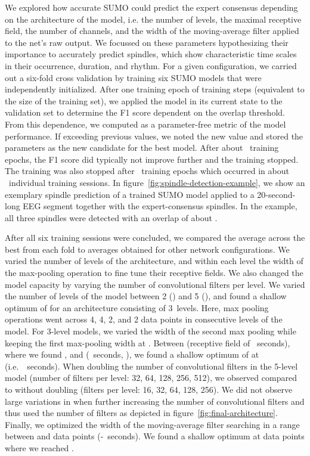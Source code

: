 \documentclass[fleqn,twocolumn,10pt]{wlscirep}
\newcommand{\Fmean}{}
\begin{document}
We explored how accurate SUMO could predict the expert
consensus depending on the architecture of the model, i.e. the number of
levels, the maximal receptive field, the number of channels,
and the width of the moving-average filter applied to the net's raw output.
We focussed on these parameters hypothesizing their importance to accurately
predict spindles, which show characteristic time scales in their occurrence,
duration, and rhythm.
For a given configuration, we carried out a six-fold cross validation by
training six SUMO models that were independently initialized. 
After one training epoch of  training steps 
(equivalent to the size of the training set), we applied the model in its
current state to the validation set to determine the F1 score dependent on the
overlap threshold.  From this dependence, we computed \Fmean{} as a
parameter-free metric of the model performance.  If exceeding previous \Fmean{}
values, we noted the new value and stored the parameters as the new candidate
for the best model.  After about ~training epochs, the F1 score did typically not
improve further and the training stopped.  The training was also stopped after
~training epochs which occurred in about ~individual training sessions.
In figure~\ref{fig:spindle-detection-example}, we show an exemplary spindle
prediction of a trained SUMO model applied to a 20-second-long EEG segment together
with the expert-consensus spindles.  In the example, all three spindles were
detected with an overlap of about .

After all six training sessions were concluded, we compared the average across
the best \Fmean{} from each fold to \Fmean{} averages obtained for other network
configurations.
We varied the number of levels of the architecture, and within each level
the width of the max-pooling operation to fine tune their receptive fields. We
also changed the model capacity by varying the number of convolutional filters
per level.
We varied the number of levels of the model between 2 (\Fmean{})
and 5 (\Fmean{}), and found a shallow optimum of
\Fmean{} for an architecture consisting of 3~levels.  Here, max
pooling operations went across 4, 4, 2, and 2 data points in consecutive levels
of the model.
For 3-level models, we varied the width  of the second max pooling while
keeping the first max-pooling width  at .  Between  (receptive
field of ~seconds), where we found \Fmean{}, and 
(~seconds, \Fmean{}), we found a shallow optimum of
\Fmean{} at  (i.e.~~seconds).
When doubling the number of convolutional filters in the 5-level model (number
of filters per level: 32, 64, 128, 256, 512), we observed
\Fmean{} compared to \Fmean{} without doubling
(filters per level: 16, 32, 64, 128, 256). We did not observe large variations
in \Fmean{} when further increasing the number of convolutional filters and thus
used the number of filters as depicted in figure~\ref{fig:final-architecture}.
Finally, we optimized the width of the moving-average filter searching in a range
between  and  data points (-~seconds).  We found a shallow
optimum at  data points where we reached \Fmean{}.
\end{document}
